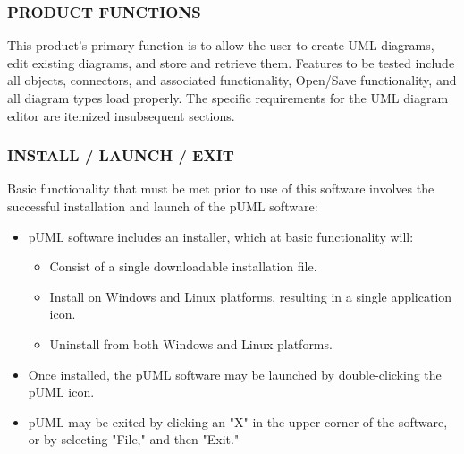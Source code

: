 \documentclass[twoside,letterpaper]{article}
\begin{document}
\subsubsection[PRODUCT FUNCTIONS ]
{\bfseries PRODUCT FUNCTIONS}

This product's primary function is to allow the user to create UML diagrams, edit existing diagrams, and store and retrieve them. \newline 
Features to be tested include all objects, connectors, and associated functionality, Open/Save functionality, and all diagram types load properly. The specific requirements for the UML diagram editor are itemized insubsequent sections. 

\bigskip


\subsubsection[INSTALL / LAUNCH / EXIT]
{\bfseries INSTALL / LAUNCH / EXIT}

Basic functionality that must be met prior to use of this software involves the successful installation and launch of the pUML software:
\begin{itemize}
\item pUML software includes an installer, which at basic functionality will:
\begin{itemize}
\item Consist of a single downloadable installation file.
\item Install on Windows and Linux platforms, resulting in a single application icon.
\item Uninstall from both Windows and Linux platforms.
\end{itemize}
\item Once installed, the pUML software may be launched by double-clicking the pUML icon.
\item pUML may be exited by clicking an "X" in the upper corner of the software, or by selecting "File,"  and then "Exit." 
\end{itemize}

\bigskip
\end{document}
